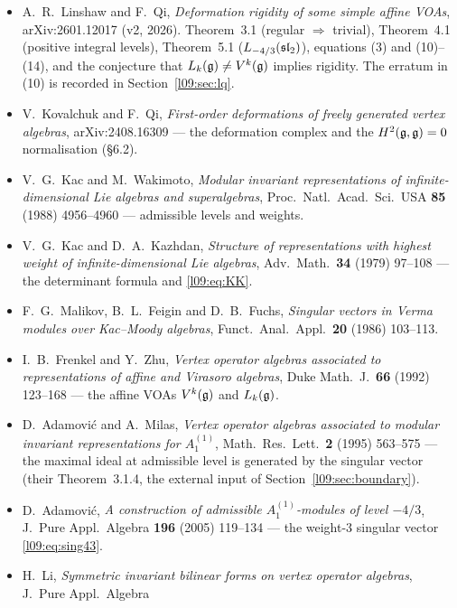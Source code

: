 \begin{sloppypar}
\begin{itemize}[leftmargin=1.5em]
\item A.~R.~Linshaw and F.~Qi, \emph{Deformation rigidity of some simple affine VOAs},
  arXiv:2601.12017 (v2, 2026). Theorem~3.1 (regular $\Rightarrow$ trivial), Theorem~4.1 (positive
  integral levels), Theorem~5.1 ($L_{-4/3}(\mathfrak{sl}_2)$), equations (3) and (10)--(14), and the conjecture
  that $L_k(\mathfrak{g})\neq V^k(\mathfrak{g})$ implies rigidity. The erratum in (10) is recorded in
  Section~\ref{l09:sec:lq}.
\item V.~Kovalchuk and F.~Qi, \emph{First-order deformations of freely generated vertex algebras},
  arXiv:2408.16309 --- the deformation complex and the $H^2(\mathfrak{g},\mathfrak{g}) = 0$ normalisation (\S6.2).
\item V.~G.~Kac and M.~Wakimoto, \emph{Modular invariant representations of infinite-dimensional Lie
  algebras and superalgebras}, Proc.\ Natl.\ Acad.\ Sci.\ USA \textbf{85} (1988) 4956--4960 --- admissible
  levels and weights.
\item V.~G.~Kac and D.~A.~Kazhdan, \emph{Structure of representations with highest weight of infinite-dimensional
  Lie algebras}, Adv.\ Math.\ \textbf{34} (1979) 97--108 --- the determinant formula and \eqref{l09:eq:KK}.
\item F.~G.~Malikov, B.~L.~Feigin and D.~B.~Fuchs, \emph{Singular vectors in Verma modules over Kac--Moody
  algebras}, Funct.\ Anal.\ Appl.\ \textbf{20} (1986) 103--113.
\item I.~B.~Frenkel and Y.~Zhu, \emph{Vertex operator algebras associated to representations of affine and
  Virasoro algebras}, Duke Math.\ J.\ \textbf{66} (1992) 123--168 --- the affine VOAs $V^k(\mathfrak{g})$ and
  $L_k(\mathfrak{g})$.
\item D.~Adamovi\'c and A.~Milas, \emph{Vertex operator algebras associated to modular invariant representations
  for $A_1^{(1)}$}, Math.\ Res.\ Lett.\ \textbf{2} (1995) 563--575 --- the maximal ideal at admissible
  level is generated by the singular vector (their Theorem~3.1.4, the external input of
  Section~\ref{l09:sec:boundary}).
\item D.~Adamovi\'c, \emph{A construction of admissible $A_1^{(1)}$-modules of level $-4/3$}, J.\ Pure Appl.\
  Algebra \textbf{196} (2005) 119--134 --- the weight-3 singular vector \eqref{l09:eq:sing43}.
\item H.~Li, \emph{Symmetric invariant bilinear forms on vertex operator algebras}, J.\ Pure Appl.\ Algebra

\end{itemize}
\end{sloppypar}
